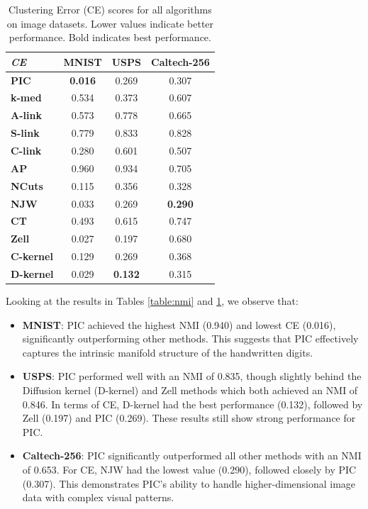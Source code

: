 \begin{table}[h]
\centering
\begin{tabular}{|l|c|c|c|}
\hline
\textit{CE} & \textbf{MNIST} & \textbf{USPS} & \textbf{Caltech-256} \\
\hline
\textbf{PIC}       & \textbf{0.016} & 0.269 & 0.307 \\ \hline
\textbf{k-med}     & 0.534 & 0.373 & 0.607 \\ \hline
\textbf{A-link}    & 0.573 & 0.778 & 0.665 \\ \hline
\textbf{S-link}    & 0.779 & 0.833 & 0.828 \\ \hline
\textbf{C-link}    & 0.280 & 0.601 & 0.507 \\ \hline
\textbf{AP}        & 0.960 & 0.934 & 0.705 \\ \hline
\textbf{NCuts}     & 0.115 & 0.356 & 0.328 \\ \hline
\textbf{NJW}       & 0.033 & 0.269 & \textbf{0.290} \\ \hline
\textbf{CT}        & 0.493 & 0.615 & 0.747 \\ \hline
\textbf{Zell}      & 0.027 & 0.197 & 0.680 \\ \hline
\textbf{C-kernel}  & 0.129 & 0.269 & 0.368 \\ \hline
\textbf{D-kernel}  & 0.029 & \textbf{0.132} & 0.315 \\
\hline
\end{tabular}
\caption{Clustering Error (CE) scores for all algorithms on image datasets. Lower values indicate better performance. Bold indicates best performance.}
\label{table:ce}
\end{table}

Looking at the results in Tables \ref{table:nmi} and \ref{table:ce}, we observe that:

\begin{itemize}
    \item \textbf{MNIST}: PIC achieved the highest NMI (0.940) and lowest CE (0.016), significantly outperforming other methods. This suggests that PIC effectively captures the intrinsic manifold structure of the handwritten digits.
    
    \item \textbf{USPS}: PIC performed well with an NMI of 0.835, though slightly behind the Diffusion kernel (D-kernel) and Zell methods which both achieved an NMI of 0.846. In terms of CE, D-kernel had the best performance (0.132), followed by Zell (0.197) and PIC (0.269). These results still show strong performance for PIC.
    
    \item \textbf{Caltech-256}: PIC significantly outperformed all other methods with an NMI of 0.653. For CE, NJW had the lowest value (0.290), followed closely by PIC (0.307). This demonstrates PIC's ability to handle higher-dimensional image data with complex visual patterns.
\end{itemize}


